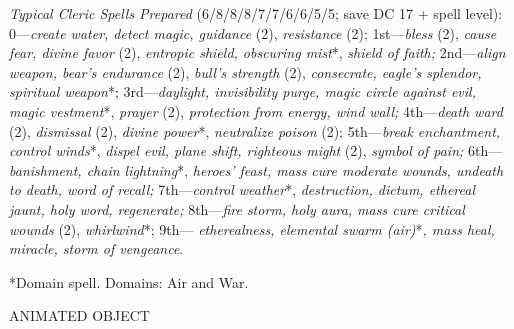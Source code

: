 \documentclass{article}
\begin{document}
\textit{Typical Cleric Spells Prepared }(6/8/8/8/7/7/6/6/5/5; save DC 17 + spell 
level): 0---\textit{create water, detect magic, guidance }(2), \textit{resistance 
} (2); 1st---\textit{bless }(2), \textit{cause fear, divine favor }(2), \textit{entropic 
shield, obscuring mist}*, \textit{shield of faith; }2nd---\textit{align weapon, 
bear's endurance }(2), \textit{bull's strength }(2), \textit{consecrate, eagle's 
splendor, spiritual weapon}*; 3rd---\textit{daylight, invisibility purge, magic 
circle against evil, magic vestment}*, \textit{prayer }(2), \textit{protection 
from energy, wind wall; }4th---\textit{death ward }(2), \textit{dismissal }(2), 
\textit{divine power}*, \textit{neutralize poison }(2); 5th---\textit{break enchantment, 
control winds}*, \textit{dispel evil, plane shift, righteous might }(2), \textit{symbol 
of pain; }6th---\textit{banishment, chain lightning}*, \textit{heroes' feast, mass 
cure moderate wounds, undeath to death, word of recall; }7th---\textit{control 
weather}*, \textit{destruction, dictum, ethereal jaunt, holy word, regenerate; 
}8th---\textit{fire storm, holy aura, mass cure critical wounds }(2), \textit{whirlwind}*; 
9th--- \textit{etherealness, elemental swarm (air)}*\textit{, mass heal, miracle, 
storm of vengeance}.

*Domain spell. Domains: Air and War.

\vspace{12pt}
{\LARGE{}ANIMATED OBJECT}
\end{document}
